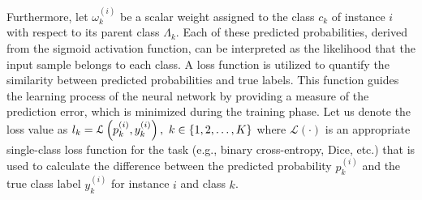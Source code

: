 Furthermore, let $\omega_k^{(i)} $ be a scalar weight assigned to the class $c_k $ of instance $i $ with respect to its parent class $\Lambda_k$.
Each of these predicted probabilities, derived from the sigmoid activation function, can be interpreted as the likelihood that the input sample belongs to each class. A loss function is utilized to quantify the similarity between predicted probabilities and true labels. This function guides the learning process of the neural network by providing a measure of the prediction error, which is minimized during the training phase.
Let us denote the loss value as $l_k = \mathcal{L} \left(p_k^{(i)},y_k^{(i)}\right),\hspace{0.33em}k \in \{1,2,\dots,K\} $ where $\mathcal{L}(\cdot) $ is an appropriate single-class loss function for the task (e.g., binary cross-entropy, Dice, etc.) that is used to calculate the difference between the predicted probability $p_k^{(i)} $ and the true class label $y_k^{(i)} $ for instance $i$ and class $k $.
%
